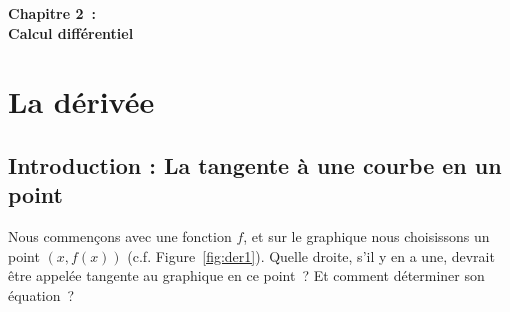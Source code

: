 \documentclass[a4paper,12pt]{article}
\begin{document}
\setlength{\cftbeforesecskip}{2pt}

\setlength{\cftsecindent}{1em}
\begin{center}
{\bfseries \Huge Chapitre 2~: \\Calcul différentiel}
\vspace{1cm}

\end{center}\vspace{-1cm}
\tableofcontents

\newpage
\section{La dérivée}

\subsection{Introduction : La tangente à une courbe en un point}

Nous commençons avec une fonction $f$, et sur le graphique nous choisissons un point $(x, f(x))$ (c.f. Figure~\ref{fig:der1}). Quelle droite, s'il y en a une, devrait être appelée tangente au graphique en ce point~? Et comment déterminer son équation~?
\end{document}
